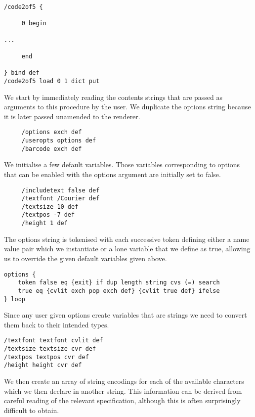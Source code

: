 \documentclass []{article}
\begin{document}
\begin{verbatim}
/code2of5 {
 
     0 begin

...

     end

} bind def
/code2of5 load 0 1 dict put
\end{verbatim}

We start by immediately reading the contents strings that are passed as
arguments to this procedure by the user. We duplicate the options string
because it is later passed unamended to the renderer.

\begin{verbatim}
     /options exch def
     /useropts options def
     /barcode exch def
\end{verbatim}

We initialise a few default variables. Those variables corresponding to 
options that can be enabled with the options argument are initially
set to false.

\begin{verbatim}
     /includetext false def 
     /textfont /Courier def
     /textsize 10 def
     /textpos -7 def
     /height 1 def
\end{verbatim}

The options string is tokenised with each successive token defining either a
name value pair which we instantiate or a lone variable that we define as true, 
allowing us to override the given default variables given above.

\begin{verbatim}
options {
    token false eq {exit} if dup length string cvs (=) search
    true eq {cvlit exch pop exch def} {cvlit true def} ifelse
} loop
\end{verbatim}      

Since any user given options create variables that are strings we need to convert
them back to their intended types.

\begin{verbatim}
/textfont textfont cvlit def
/textsize textsize cvr def
/textpos textpos cvr def
/height height cvr def	     
\end{verbatim}

We then create an array of string encodings for each of the available
characters which we then declare in another string. This information
can be derived from careful reading of the relevant specification, 
although this is often surprisingly difficult to obtain. 
\end{document}
